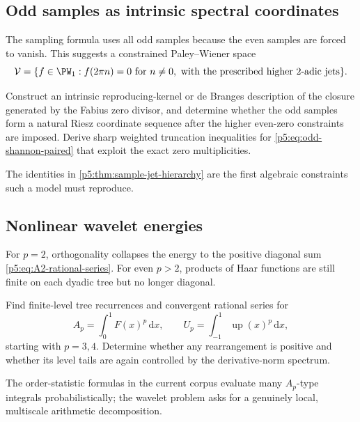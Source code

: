 \documentclass[11pt,oneside]{article}
\theoremstyle{definition}
\newcommand{\dd}{\,\mathrm d}
\newcommand{\Up}{\operatorname{up}}
\begin{document}
\subsection{Odd samples as intrinsic spectral coordinates}

The sampling formula uses all odd samples because the even samples are forced
to vanish.  This suggests a constrained Paley--Wiener space
\begin{equation}
 \mathcal V=\{f\in\PW_1:f(2\pi n)=0\text{ for }n\ne0,
 \text{ with the prescribed higher }2\text{-adic jets}\}.              \label{p5:eq:constrained-PW}
\end{equation}

\begin{problem}
Construct an intrinsic reproducing-kernel or de Branges description of the
closure generated by the Fabius zero divisor, and determine whether the odd
samples form a natural Riesz coordinate sequence after the higher even-zero
constraints are imposed.  Derive sharp weighted truncation inequalities for
\eqref{p5:eq:odd-shannon-paired} that exploit the exact zero multiplicities.
\end{problem}

The identities in \cref{p5:thm:sample-jet-hierarchy} are the first algebraic
constraints such a model must reproduce.

\subsection{Nonlinear wavelet energies}

For $p=2$, orthogonality collapses the energy to the positive diagonal sum
\eqref{p5:eq:A2-rational-series}.  For even $p>2$, products of Haar functions are
still finite on each dyadic tree but no longer diagonal.

\begin{problem}
Find finite-level tree recurrences and convergent rational series for
\[
 A_p=\int_0^1F(x)^p\dd x,
 \qquad
 U_p=\int_{-1}^{1}\Up(x)^p\dd x,
\]
starting with $p=3,4$.  Determine whether any rearrangement is positive and
whether its level tails are again controlled by the derivative-norm spectrum.
\end{problem}

The order-statistic formulas in the current corpus evaluate many $A_p$-type
integrals probabilistically; the wavelet problem asks for a genuinely local,
multiscale arithmetic decomposition.
\end{document}
